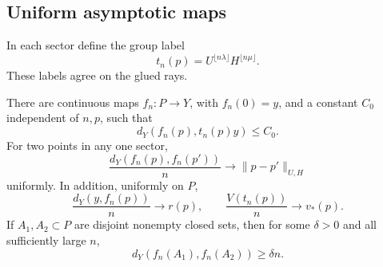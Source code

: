 \subsection{Uniform asymptotic maps}

In each sector define the group label
\begin{equation}\label{eq:sector-label}
 t_n(p)=U^{\lfloor n\lambda\rfloor}H^{\lfloor n\mu\rfloor}.
\end{equation}
These labels agree on the glued rays.

\begin{samepage}
\begin{lemma}\label{lem:sector-maps}
There are continuous maps \(f_n:P\to Y\), with \(f_n(0)=y\), and a
constant \(C_0\) independent of \(n,p\), such that
\begin{equation}\label{eq:grid-error}
 d_Y(f_n(p),t_n(p)y)\le C_0.
\end{equation}
For two points in any one sector,
\begin{equation}\label{eq:sector-convergence}
 \frac{d_Y(f_n(p),f_n(p'))}{n}
 \longrightarrow\|p-p'\|_{U,H}
\end{equation}
uniformly.  In addition, uniformly on \(P\),
\begin{equation}\label{eq:radial-coordinates}
 \frac{d_Y(y,f_n(p))}{n}\longrightarrow r(p),
 \qquad
 \frac{V(t_n(p))}{n}\longrightarrow v_*(p).
\end{equation}
If \(A_1,A_2\subset P\) are disjoint nonempty closed sets, then for
some \(\delta>0\) and all sufficiently large \(n\),
\begin{equation}\label{eq:region-separation}
 d_Y(f_n(A_1),f_n(A_2))\ge\delta n.
\end{equation}
\end{lemma}
\end{samepage}

